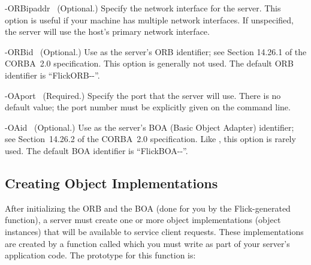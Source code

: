 \begin{optionlist}
  \item[-ORBipaddr~\optionarg{ipaddress}]
  (Optional.)  Specify the network interface for the server.  This option is
  useful if your machine has multiple network interfaces.  If unspecified, the
  server will use the host's primary network interface.

  \item[-ORBid~\optionarg{name}]
  (Optional.)  Use  as the server's ORB identifier; see Section
  14.26.1 of the CORBA~2.0 specification.  This option is generally not used.
  The default ORB identifier is ``FlickORB-{}-''.

  \item[-OAport~\optionarg{portnumber}]
  (Required.)  Specify the port that the server will use.  There is no default
  value; the port number must be explicitly given on the command line.

  \item[-OAid~\optionarg{name}]
  (Optional.)  Use  as the server's BOA (Basic Object Adapter)
  identifier; see Section~14.26.2 of the CORBA~2.0 specification.  Like
  , this option is rarely used.  The default BOA identifier is
  ``FlickBOA-{}-''.
\end{optionlist}



\subsection{Creating Object Implementations}
\label{subsec:Creating Object Implementations}

After initializing the ORB and the BOA (done for you by the Flick-generated
 function), a server must create one or more object
implementations (object instances) that will be available to service client
requests.  These implementations are created by a function called
 which you must write as part of your server's
application code.  The prototype for this function is:

